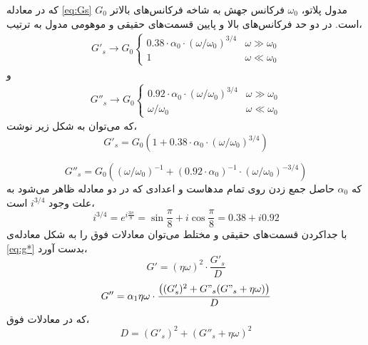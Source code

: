 که در معادله \ref{eq:Gs} $G_0$ مدول پلاتو، $\omega_0$ فرکانس جهش به شاخه فرکانس‌های بالاتر است. در دو حد فرکانس‌های بالا و پایین قسمت‌های حقیقی و موهومی مدول به ترتیب،
\begin{equation}
\begin{aligned}
G'_s\rightarrow G_0
  \begin{cases}
    0.38\cdot\alpha_0\cdot(\omega/\omega_0)^{3/4}       & \omega\gg\omega_0\\
    1       & \omega\ll\omega_0
  \end{cases}
\end{aligned}
\end{equation}
و
\begin{equation}
\begin{aligned}
G''_s\rightarrow G_0
  \begin{cases}
    0.92\cdot\alpha_0\cdot(\omega/\omega_0)^{3/4}       & \omega\gg\omega_0\\
    \omega/\omega_0       & \omega\ll\omega_0
  \end{cases}
\end{aligned}
\end{equation}
که می‌توان به شکل زیر نوشت،
\begin{equation}
G'_s=G_0(1+0.38\cdot\alpha_0\cdot(\omega/\omega_0)^{3/4})
\end{equation}


\begin{equation}
G''_s=G_0((\omega/\omega_0)^{-1}+(0.92\cdot\alpha_0)^{-1}\cdot(\omega/\omega_0)^{-3/4})
\end{equation}
که $\alpha_0$ حاصل جمع زدن روی تمام مدهاست و اعدادی که در دو معادله ظاهر می‌شود به علت وجود $i^{3/4}$ است،
\begin{equation}
i^{3/4}=e^{i\frac{3\pi}{8}}=\sin\frac{\pi}{8}+i\cos\frac{\pi}{8}=0.38+i0.92
\end{equation}
با جداکردن قسمت‌های حقیقی و مختلط می‌توان معادلات فوق را به شکل معادله‌ی \ref{eq:g*} بدست آورد،
\begin{equation}
G'=(\eta\omega)^2\cdot\frac{G'_s}{D}
\label{eq:g'}
\end{equation}
\begin{equation}
G''=\alpha_1\eta\omega\cdot\frac{\left((G'_s)^2+G"_s(G"_s+\eta\omega)\right)}{D}
\label{eq:g''}
\end{equation}
که در معادلات فوق،
\begin{equation}
D=(G'_s)^2+(G''_s+\eta\omega)^2
\end{equation}


